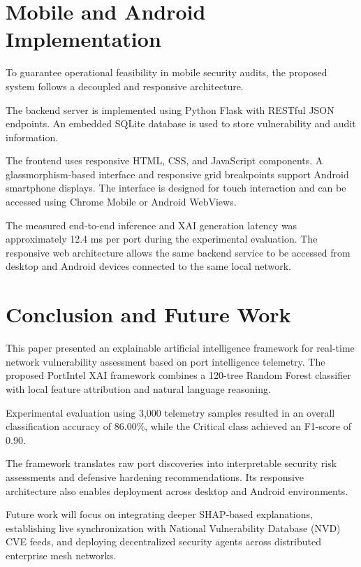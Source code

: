 \documentclass[conference]{IEEEtran}
\begin{document}
\section{Mobile and Android Implementation}
To guarantee operational feasibility in mobile security audits, the proposed system follows a decoupled and responsive architecture.

The backend server is implemented using Python Flask with RESTful JSON endpoints. An embedded SQLite database is used to store vulnerability and audit information.

The frontend uses responsive HTML, CSS, and JavaScript components. A glassmorphism-based interface and responsive grid breakpoints support Android smartphone displays. The interface is designed for touch interaction and can be accessed using Chrome Mobile or Android WebViews.

The measured end-to-end inference and XAI generation latency was approximately 12.4 ms per port during the experimental evaluation. The responsive web architecture allows the same backend service to be accessed from desktop and Android devices connected to the same local network.

\section{Conclusion and Future Work}
This paper presented an explainable artificial intelligence framework for real-time network vulnerability assessment based on port intelligence telemetry. The proposed PortIntel XAI framework combines a 120-tree Random Forest classifier with local feature attribution and natural language reasoning.

Experimental evaluation using 3,000 telemetry samples resulted in an overall classification accuracy of 86.00\%, while the Critical class achieved an F1-score of 0.90.

The framework translates raw port discoveries into interpretable security risk assessments and defensive hardening recommendations. Its responsive architecture also enables deployment across desktop and Android environments.

Future work will focus on integrating deeper SHAP-based explanations, establishing live synchronization with National Vulnerability Database (NVD) CVE feeds, and deploying decentralized security agents across distributed enterprise mesh networks.
\end{document}
